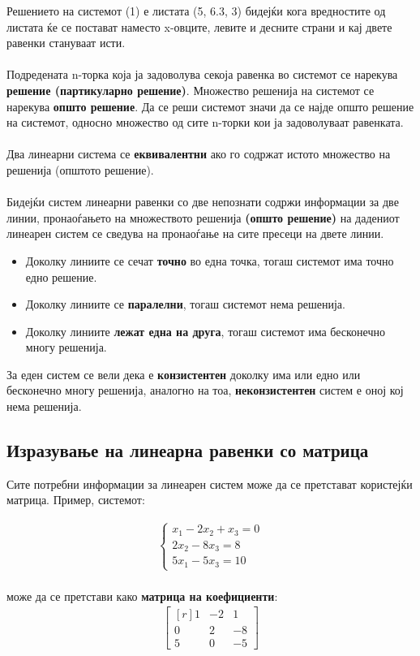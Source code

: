 \documentclass[12pt,a4paper]{article}
\begin{document}
		Решението на системот (1) е листата (5, 6.3, 3) бидејќи кога вредностите од листата ќе се постават наместо x-овците, левите и десните страни и кај двете равенки стануваат исти.
		\\ \\ 
		Подредената n-торка која ја задоволува секоја равенка во системот се нарекува \textbf{решение (партикуларно решение)}.
		Множество решенија на системот се нарекува \textbf{општо решение}.
		Да се реши системот значи да се најде општо решение на системот, односно множество од сите n-торки кои ја задоволуваат равенката.
		\\ \\
		Два линеарни система се \textbf{еквивалентни} ако го содржат истото множество на решенија (општото решение).
		\\ \\
		Бидејќи систем линеарни равенки со две непознати содржи информации за две линии, пронаоѓањето на множеството решенија \textbf{(општо решение)} на дадениот линеарен систем се сведува на пронаоѓање на сите пресеци на двете линии.
		\begin{itemize}
			\item Доколку линиите се сечат \textbf{точно} во една точка, тогаш системот има точно едно решение.
			\item Доколку линиите се \textbf{паралелни}, тогаш системот нема решенија.
			\item Доколку линиите \textbf{лежат една на друга}, тогаш системот има бесконечно многу решенија.
		\end{itemize}
		
		За еден систем се вели дека е \textbf{конзистентен} доколку има или едно или бесконечно многу решенија, аналогно на тоа, \textbf{неконзистентен} систем е оној кој нема решенија.
		
	\subsection{Изразување на линеарна равенки со матрица}
	Сите потребни информации за линеарен систем може да се претстават користејќи матрица.
	Пример, системот:
	
	\begin{align}
		\begin{cases}
			x_1 - 2x_2 + x_3 = 0 \\
			2x_2 - 8x_3 = 8 \\
			5x_1 - 5x_3 = 10	
		\end{cases}
	\end{align}
	\\
	може да се претстави како \textbf{матрица на коефициенти}:
	\begin{align}
		\begin{bmatrix*}[r]
			1 & -2 & 1\\
			0 & 2 & -8\\
			5 & 0 & -5
		\end{bmatrix*}
	\end{align}
\end{document}
